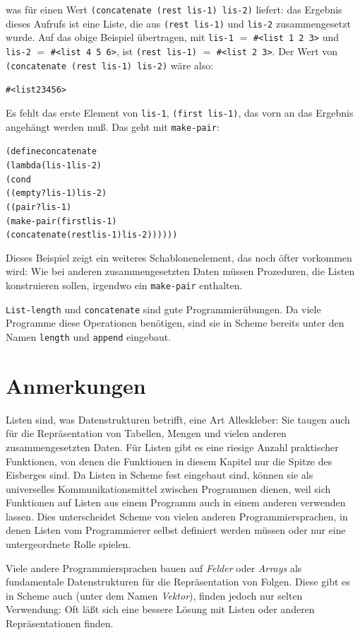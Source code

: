 was für einen Wert \texttt{(concatenate (rest lis-1) lis-2)} liefert: das Ergebnis
dieses Aufrufs ist eine
Liste, die aus \texttt{(rest lis-1)} und \texttt{lis-2} zusammengesetzt
wurde.  Auf das obige Beispiel übertragen, mit \texttt{lis-1} $=$
\verb|#<list 1 2 3>| und \texttt{lis-2} $=$
\verb|#<list 4 5 6>|, ist \texttt{(rest lis-1)} $=$ \verb|#<list 2 3>|.
Der Wert von \texttt{(concatenate (rest lis-1) lis-2)} wäre
also:
%
\begin{alltt}
#<list 2 3 4 5 6>
\end{alltt}
%
Es fehlt das erste Element von \texttt{lis-1}, \texttt{(first
  lis-1)}, das vorn an das Ergebnis angehängt werden muß.  Das geht
mit \texttt{make-pair}:
%
\begin{alltt}
(define concatenate
  (lambda (lis-1 lis-2)
    (cond
      ((empty? lis-1) lis-2)
      ((pair? lis-1) 
       (make-pair (first lis-1)
                  (concatenate (rest lis-1) lis-2))))))
\end{alltt}
%
Dieses Beispiel zeigt ein weiteres Schablonenelement, das noch öfter
vorkommen wird:  Wie bei anderen zusammengesetzten Daten müssen Prozeduren, die
Listen konstruieren sollen, irgendwo ein \texttt{make-pair} enthalten.

\texttt{List-length} und \texttt{concatenate} sind gute
Programmierübungen.  Da viele Programme diese Operationen benötigen,
sind sie in Scheme bereits unter den Namen
\texttt{length} und
\texttt{append} eingebaut.


\section*{Anmerkungen}

Listen sind, was Datenstrukturen betrifft, eine Art Alleskleber:
Sie taugen auch für die Repräsentation von Tabellen,
Mengen und vielen anderen zusammengesetzten Daten.  Für Listen gibt es
eine riesige Anzahl praktischer Funktionen, von denen die Funktionen in
diesem Kapitel nur die Spitze des Eisberges sind.  Da 
Listen in Scheme fest eingebaut sind, können sie als universelles
Kommunikationsmittel zwischen Programmen dienen, weil sich Funktionen
auf Listen aus einem Programm auch in einem anderen verwenden lassen.
Dies unterscheidet Scheme von vielen anderen Programmiersprachen, in
denen Listen vom Programmierer selbst definiert werden müssen oder nur
eine untergeordnete Rolle spielen.

Viele andere Programmiersprachen bauen auf \textit{Felder} oder
\textit{Arrays} als fundamentale Datenstrukturen für die
Repräsentation von Folgen.  Diese gibt es in
Scheme auch (unter dem Namen \textit{Vektor}), finden jedoch
nur selten Verwendung: Oft läßt sich eine
bessere Lösung mit Listen oder anderen Repräsentationen finden.

